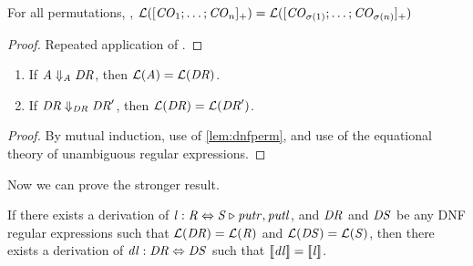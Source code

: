 \begin{lemma}
\label{lem:dnfperm}
For all permutations, \Permutation{},
$\mathcal{L}([\mathit{CO}_1;\ldots;\mathit{CO}_n]_{+})=
\mathcal{L}([\mathit{CO}_{\sigma(1)};\ldots;
\mathit{CO}_{\sigma(n)}]_{+})$
\end{lemma}
\begin{proof}
Repeated application of \OrCommutativityRule{}.
\end{proof}

\begin{lemma}\leavevmode
\label{lem:language-rewrite-safe}
\begin{enumerate}
\item If $\mathit{A}\Downarrow_{\mathit{A}}\mathit{DR}$, then
$\mathcal{L}(\mathit{A})=\mathcal{L}(\mathit{DR})$.
\item If $\mathit{DR}\Downarrow_{\mathit{DR}}\mathit{DR}'$, then
$\mathcal{L}(\mathit{DR})=\mathcal{L}(\mathit{DR}')$.
\end{enumerate}
\end{lemma}
\begin{proof}
By mutual induction, use of \ref{lem:dnfperm}, and use of the equational
theory of unambiguous regular expressions.
\end{proof}


Now we can prove the stronger result.
\begin{theorem}
If there exists a derivation of $\mathit{l} : \mathit{R} \Leftrightarrow \mathit{S} \triangleright \mathit{putr},\mathit{putl}$,
and $\mathit{DR}$ and $\mathit{DS}$ be any DNF regular expressions
such that 
$\mathcal{L}(\mathit{DR})=\mathcal{L}(\mathit{R})$ and
$\mathcal{L}(\mathit{DS})=\mathcal{L}(\mathit{S})$,
then there exists a derivation of $\mathit{dl} : \mathit{DR} \Leftrightarrow \mathit{DS}$ such that
$[ \! [\mathit{dl}] \! ]=[ \! [\mathit{l}] \! ]$.
\end{theorem}
